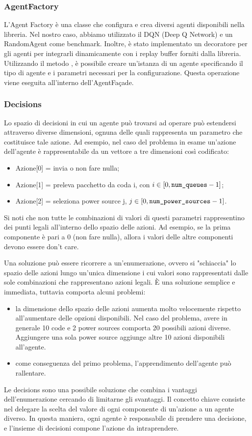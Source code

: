 \documentclass[conference]{IEEEtran}
\begin{document}
\subsubsection{AgentFactory}
L'Agent Factory è una classe che configura e crea diversi agenti disponibili nella libreria. Nel nostro caso, abbiamo utilizzato il DQN (Deep Q Network) e un RandomAgent come benchmark. Inoltre, è stato implementato un decoratore per gli agenti per integrarli dinamicamente con i replay buffer forniti dalla libreria. Utilizzando il metodo , è possibile creare un'istanza di un agente specificando il tipo di agente e i parametri necessari per la configurazione. Questa operazione viene eseguita all'interno dell'AgentFaçade.

\subsubsection{Decisions}
\label{subsec:Decisions}
Lo spazio di decisioni in cui un agente può trovarsi ad operare può estendersi
attraverso
diverse dimensioni, ognuna delle quali rappresenta un parametro che costituisce
tale azione. Ad esempio, nel caso del problema in esame un'azione dell'agente è
rappresentabile da un vettore a tre dimensioni così codificato:
\begin{itemize}
\item Azione[0] = invia o non fare nulla;
\item Azione[1] = preleva pacchetto da coda i, con $i \in [0, \texttt{num\_queues} - 1]$;
\item Azione[2] = seleziona power source j, $j \in [0, \texttt{num\_power\_sources} - 1]$.
\end{itemize}
Si noti che non tutte le combinazioni di valori di questi parametri
rappresentino dei punti legali all'interno dello spazio delle azioni.
Ad esempio, se la prima componente è pari a 0 (non fare nulla), allora i valori delle
altre componenti devono essere don't care.

Una soluzione può essere ricorrere a un'enumerazione, ovvero si "schiaccia"
lo spazio delle azioni lungo un'unica dimensione i cui valori sono rappresentati 
dalle sole combinazioni che rappresentano azioni legali. È una soluzione semplice e
immediata, tuttavia comporta alcuni problemi:
\begin{itemize}
    \item la dimensione dello spazio delle azioni aumenta molto velocemente rispetto
    all'aumentare delle opzioni disponibili. Nel caso del problema, avere in generale
    10 code e 2 power sources comporta 20 possibili azioni diverse. Aggiungere una
    sola power source aggiunge altre 10 azioni disponibili all'agente.
    \item come conseguenza del primo problema, l'apprendimento dell'agente può
    rallentare. %
\end{itemize}
Le decisions sono una possibile soluzione che combina i vantaggi dell'enumerazione
cercando di limitarne gli svantaggi. Il concetto chiave consiste nel delegare la scelta
del valore di ogni componente di un'azione a un agente diverso. In questa maniera,
ogni agente è responsabile di prendere una decisione, e l'insieme di decisioni compone
l'azione da intraprendere. 
\end{document}
